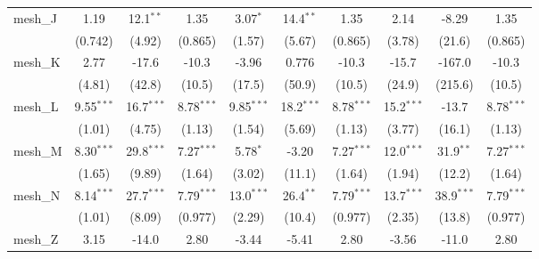 \begin{tabular}{lccccccccc}
   mesh\_J                                                     & 1.19          & 12.1$^{**}$   & 1.35          & 3.07$^{*}$    & 14.4$^{**}$   & 1.35          & 2.14          & -8.29         & 1.35\\   
                                                               & (0.742)       & (4.92)        & (0.865)       & (1.57)        & (5.67)        & (0.865)       & (3.78)        & (21.6)        & (0.865)\\   
   mesh\_K                                                     & 2.77          & -17.6         & -10.3         & -3.96         & 0.776         & -10.3         & -15.7         & -167.0        & -10.3\\   
                                                               & (4.81)        & (42.8)        & (10.5)        & (17.5)        & (50.9)        & (10.5)        & (24.9)        & (215.6)       & (10.5)\\   
   mesh\_L                                                     & 9.55$^{***}$  & 16.7$^{***}$  & 8.78$^{***}$  & 9.85$^{***}$  & 18.2$^{***}$  & 8.78$^{***}$  & 15.2$^{***}$  & -13.7         & 8.78$^{***}$\\   
                                                               & (1.01)        & (4.75)        & (1.13)        & (1.54)        & (5.69)        & (1.13)        & (3.77)        & (16.1)        & (1.13)\\   
   mesh\_M                                                     & 8.30$^{***}$  & 29.8$^{***}$  & 7.27$^{***}$  & 5.78$^{*}$    & -3.20         & 7.27$^{***}$  & 12.0$^{***}$  & 31.9$^{**}$   & 7.27$^{***}$\\   
                                                               & (1.65)        & (9.89)        & (1.64)        & (3.02)        & (11.1)        & (1.64)        & (1.94)        & (12.2)        & (1.64)\\   
   mesh\_N                                                     & 8.14$^{***}$  & 27.7$^{***}$  & 7.79$^{***}$  & 13.0$^{***}$  & 26.4$^{**}$   & 7.79$^{***}$  & 13.7$^{***}$  & 38.9$^{***}$  & 7.79$^{***}$\\   
                                                               & (1.01)        & (8.09)        & (0.977)       & (2.29)        & (10.4)        & (0.977)       & (2.35)        & (13.8)        & (0.977)\\   
   mesh\_Z                                                     & 3.15          & -14.0         & 2.80          & -3.44         & -5.41         & 2.80          & -3.56         & -11.0         & 2.80\\   

\end{tabular}
